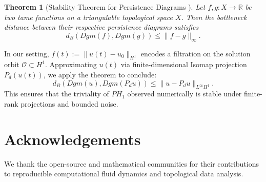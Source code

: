 \documentclass[11pt]{article}
\newtheorem{theorem}{Theorem}[section]
\theoremstyle{definition}
\begin{document}
\begin{theorem}[Stability Theorem for Persistence Diagrams \cite{CohenSteiner2007}]
Let $f, g : X \to \mathbb{R}$ be two tame functions on a triangulable topological space $X$. Then the bottleneck distance between their respective persistence diagrams satisfies
\[
d_B(Dgm(f), Dgm(g)) \le \|f - g\|_\infty.
\]
\end{theorem}

\noindent In our setting, $f(t) := \|u(t) - u_0\|_{H^1}$ encodes a filtration on the solution orbit $\mathcal O \subset H^1$. Approximating $u(t)$ via finite-dimensional Isomap projection $P_d(u(t))$, we apply the theorem to conclude:
\[
d_B(Dgm(u), Dgm(P_d u)) \le \|u - P_d u\|_{L^\infty H^1}.
\]
This ensures that the triviality of $PH_1$ observed numerically is stable under finite-rank projections and bounded noise.

\section*{Acknowledgements}
We thank the open-source and mathematical communities for their contributions to reproducible computational fluid dynamics and topological data analysis.
\end{document}
